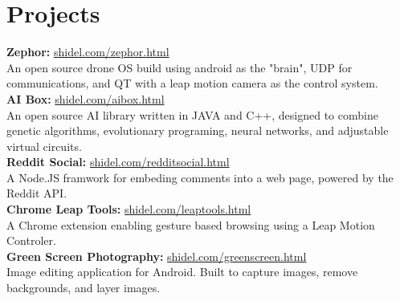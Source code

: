 \documentclass[10pt]{article}
\begin{document}
{\begin{minipage}[t]{0.5\textwidth}
\section{Projects} 
\textbf{Zephor:} \hfill \href{http://shidel.com/zephor.html}{shidel.com/zephor.html}
\vspace{0.5 mm}\\
An open source drone OS build using android as the "brain", UDP for communications, and QT with a leap motion camera as the control system. \\

\textbf{AI Box:} \hfill \href{http://shidel.com/aibox.html}{shidel.com/aibox.html}
\vspace{0.5 mm}\\
An open source AI library written in JAVA and C++, designed to combine genetic algorithms, evolutionary programing, neural networks, and adjustable virtual circuits. \\

\textbf{Reddit Social:} \hfill \href{http://shidel.com/redditsocial.html}{shidel.com/redditsocial.html}
\vspace{0.5 mm}\\
A Node.JS framwork for embeding comments into a web page, powered by the Reddit API. \\

\textbf{Chrome Leap Tools:} \hfill \href{http://shidel.com/leaptools.html}{shidel.com/leaptools.html}
\vspace{0.5 mm}\\
A Chrome extension enabling gesture based browsing using a Leap Motion Controler.\\

\textbf{Green Screen Photography:} \hfill \href{http://shidel.com/greenscreen.html}{shidel.com/greenscreen.html}
\vspace{0.5 mm}\\
Image editing application for Android. Built to capture images, remove backgrounds, and
layer images. \\


\end{minipage} %
\hfill
\begin{minipage}[t]{0.44\textwidth} %
\vspace{0pt} %


\end{minipage}}
\end{document}
